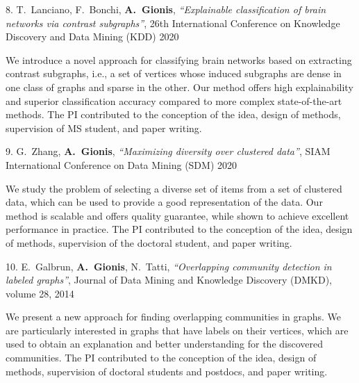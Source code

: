 \documentclass[a4paper,11pt]{article}
\begin{document}
\textbibspace

\item[{8.}]
{T.\ Lanciano, F.\ Bonchi, \textbf{A.\ Gionis}},
{\em ``Explainable classification of brain networks via contrast subgraphs''},
26th International Conference on Knowledge Discovery and Data Mining (KDD) 2020
%
\item[]
We introduce a novel approach for classifying brain networks based on extracting contrast subgraphs, 
i.e., a set of vertices whose induced subgraphs are dense in one class of graphs and sparse in the other.
Our method offers high explainability and superior classification accuracy
compared to more complex state-of-the-art methods.
The PI contributed to the conception of the idea, 
design of methods, supervision of MS student, and paper writing.


\textbibspace

\item[{9.}]
{G.\ Zhang, \textbf{A.\ Gionis}},
{\em ``Maximizing diversity over clustered data''},
SIAM International Conference on Data Mining (SDM) 2020
%
\item[]
We study the problem of selecting a diverse set of items 
from a set of clustered data, which can be used to provide 
a good representation of the data. 
Our method is scalable and offers quality guarantee, 
while shown to achieve excellent performance in practice. 
The PI contributed to the conception of the idea, 
design of methods, supervision of the doctoral student, and paper writing.

\textbibspace

\item[{10.}]
{E.\ Galbrun, \textbf{A.\ Gionis}, N.\ Tatti}, 
{\em ``Overlapping community detection in labeled graphs''}, 
Journal of Data Mining and Knowledge Discovery (DMKD), volume 28, 2014
%
\item[]

We present a new approach for finding overlapping communities in graphs. 
We are particularly interested in graphs that have labels on their vertices, 
which are used to obtain an explanation and better understanding for the discovered communities.
The PI contributed to the conception of the idea, 
design of methods, supervision of doctoral students and postdocs, and paper writing.
\end{document}
